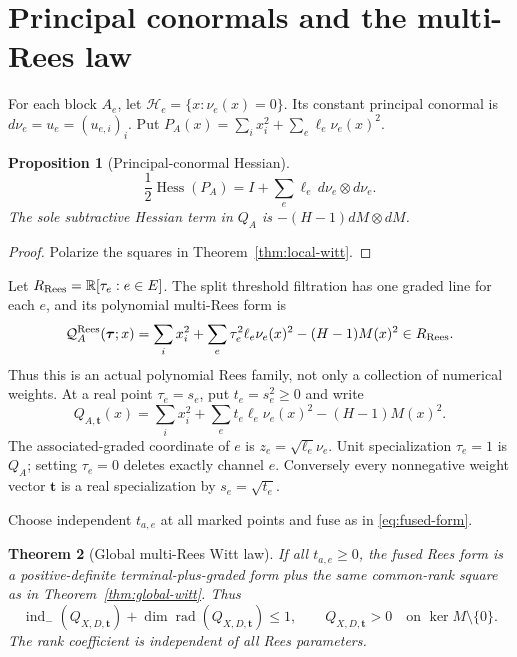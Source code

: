 \documentclass[11pt,a4paper]{amsart}
\theoremstyle{plain}
\newtheorem{theorem}{Theorem}[section]
\newtheorem{proposition}[theorem]{Proposition}
\theoremstyle{definition}
\newcommand{\RR}{\mathbb R}
\newcommand{\indm}{\operatorname{ind}_{-}}
\newcommand{\Rad}{\operatorname{rad}}
\newcommand{\Hess}{\operatorname{Hess}}
\begin{document}
\section{Principal conormals and the multi-Rees law}\label{sec:rees}

For each block $A_e$, let $\mathcal H_e=\{x:\nu_e(x)=0\}$.  Its constant principal conormal is
$d\nu_e=u_e=(u_{e,i})_i$.  Put
$P_A(x)=\sum_i x_i^2+\sum_e\ell_e\nu_e(x)^2$.

\begin{proposition}[Principal-conormal Hessian]\label{prop:hessian}
\begin{equation}\label{eq:hessian}
                   \frac12\Hess(P_A)=I+\sum_e\ell_e\,d\nu_e\otimes d\nu_e.
\end{equation}
The sole subtractive Hessian term in $Q_A$ is $-(H-1)dM\otimes dM$.
\end{proposition}

\begin{proof}
Polarize the squares in Theorem~\ref{thm:local-witt}.
\end{proof}

Let $R_{\rm Rees}=\RR[\tau_e:e\in E]$.  The split threshold filtration has one graded line for
each $e$, and its polynomial multi-Rees form is
\begin{equation}\label{eq:polynomial-rees}
 \mathcal Q_A^{\rm Rees}(\boldsymbol\tau;x)
 =\sum_i x_i^2+\sum_e\tau_e^2\ell_e\nu_e(x)^2-(H-1)M(x)^2
 \in R_{\rm Rees}.
\end{equation}
Thus this is an actual polynomial Rees family, not only a collection of numerical weights.  At a
real point $\tau_e=s_e$, put $t_e=s_e^2\geq0$ and write
\begin{equation}\label{eq:local-rees}
 Q_{A,\boldsymbol t}(x)=\sum_i x_i^2+
       \sum_et_e\ell_e\nu_e(x)^2-(H-1)M(x)^2.
\end{equation}
The associated-graded coordinate of $e$ is $z_e=\sqrt{\ell_e}\nu_e$.  Unit specialization
$\tau_e=1$ is $Q_A$; setting $\tau_e=0$ deletes exactly channel $e$.  Conversely every
nonnegative weight vector $\boldsymbol t$ is a real specialization by $s_e=\sqrt{t_e}$.

Choose independent $t_{a,e}$ at all marked points and fuse as in \eqref{eq:fused-form}.

\begin{theorem}[Global multi-Rees Witt law]\label{thm:global-rees}
If all $t_{a,e}\geq0$, the fused Rees form is a positive-definite terminal-plus-graded form plus
the same common-rank square as in Theorem~\ref{thm:global-witt}.  Thus
\[
 \indm(Q_{X,D,\boldsymbol t})+\dim\Rad(Q_{X,D,\boldsymbol t})\leq1,
 \qquad Q_{X,D,\boldsymbol t}>0\quad\text{on }\ker M\setminus\{0\}.
\]
The rank coefficient is independent of all Rees parameters.
\end{theorem}
\end{document}
